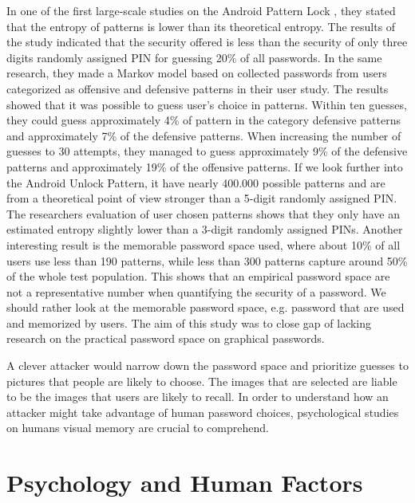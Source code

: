   In one of the first large-scale studies on the Android Pattern Lock \cite{Uellenbeck}, they stated that the entropy of patterns is lower than its theoretical entropy. The results of the study indicated that the security offered is less than the security of only three digits randomly assigned PIN for guessing 20\% of all passwords. In the same research, they made a Markov model based on collected passwords from users categorized as offensive and defensive patterns in their user study. The results showed that it was possible to guess user's choice in patterns. Within ten guesses, they could guess approximately 4\% of pattern in the category defensive patterns and approximately 7\% of the defensive patterns. When increasing the number of guesses to 30 attempts, they managed to guess approximately 9\% of the defensive patterns and approximately 19\% of the offensive patterns. If we look further into the Android Unlock Pattern, it have nearly 400.000 possible patterns and are from a theoretical point of view stronger than a 5-digit randomly assigned PIN. The researchers evaluation of user chosen patterns shows that they only have an estimated entropy slightly lower than a 3-digit randomly assigned PINs. Another interesting result is the memorable password space used, where about 10\% of all users use less than 190 patterns, while less than 300 patterns capture around 50\% of the whole test population. This shows that an empirical password space are not a representative number when quantifying the security of a password. We should rather look at the memorable password space, e.g. password that are used and memorized by users. The aim of this study was to close gap of lacking research on the practical password space on graphical passwords.

  A clever attacker would narrow down the password space and prioritize guesses to pictures that people are likely to choose. The images that are selected are liable to be the images that users are likely to recall. In order to understand how an attacker might take advantage of human password choices, psychological studies on humans visual memory are crucial to comprehend. 

\clearpage
\section{Psychology and Human Factors} \label{sec:humanfactors}

